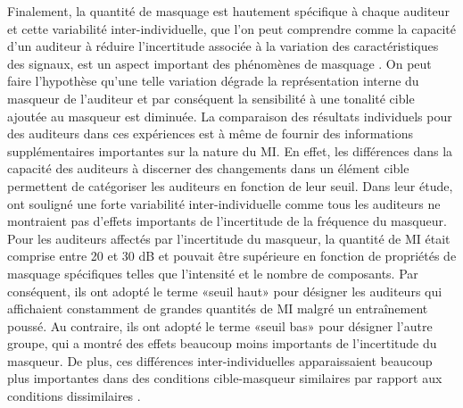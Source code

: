 Finalement, la quantité de masquage est hautement spécifique à chaque auditeur et cette variabilité inter-individuelle, que l'on peut comprendre comme la capacité d'un auditeur à réduire l'incertitude associée à la variation des caractéristiques des signaux, est un aspect important des phénomènes de masquage \citep{durlach2003informational, neff1993informational, oxenham2003informational}. 
On peut faire l'hypothèse qu'une telle variation dégrade la représentation interne du masqueur de l'auditeur et par conséquent la sensibilité à une tonalité cible ajoutée au masqueur est diminuée. 
La comparaison des résultats individuels pour des auditeurs dans ces expériences est à même de fournir des informations supplémentaires importantes sur la nature du MI.
En effet, les différences dans la capacité des auditeurs à discerner des changements dans un élément cible permettent de catégoriser les auditeurs en fonction de leur seuil.
Dans leur étude, \cite{neff1993informational} ont souligné une forte variabilité inter-individuelle comme tous les auditeurs ne montraient pas d’effets importants de l’incertitude de la fréquence du masqueur. 
Pour les auditeurs affectés par l’incertitude du masqueur, la quantité de MI était comprise entre 20 et 30 dB et pouvait être supérieure en fonction de propriétés de masquage spécifiques telles que l'intensité et le nombre de composants. 
Par conséquent, ils ont adopté le terme «seuil haut» pour désigner les auditeurs qui affichaient constamment de grandes quantités de MI malgré un entraînement poussé. 
Au contraire, ils ont adopté le terme «seuil bas» pour désigner l'autre groupe, qui a montré des effets beaucoup moins importants de l'incertitude du masqueur. 
De plus, ces différences inter-individuelles apparaissaient beaucoup plus importantes dans des conditions cible-masqueur similaires par rapport aux conditions dissimilaires \citep{durlach2003informational}. \\

